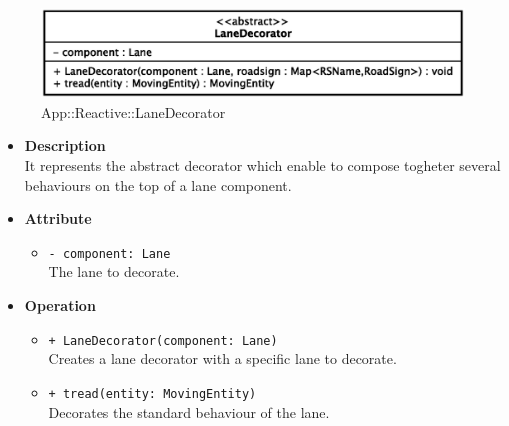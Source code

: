 \begin{figure}[h]
\centering
\includegraphics[scale=0.6,keepaspectratio]{images/solution/lane_decorator.eps}
\caption{App::Reactive::LaneDecorator}
\label{fig:sd-app-lane_decorator}
\end{figure}
\FloatBarrier
\begin{itemize}
  \item \textbf{Description} \\
    It represents the abstract decorator which enable to compose togheter several
behaviours on the top of a lane component. 
  \item \textbf{Attribute}
  \begin{itemize}
    \item \texttt{- component: Lane} \\
The lane to decorate.
  \end{itemize}
  \item \textbf{Operation}
   \begin{itemize} 
   \item \texttt{+ LaneDecorator(component: Lane)} \\
Creates a lane decorator with a specific lane to decorate.
    \item \texttt{+ tread(entity: MovingEntity)} \\
Decorates the standard behaviour of the lane.  
  \end{itemize}
\end{itemize}
